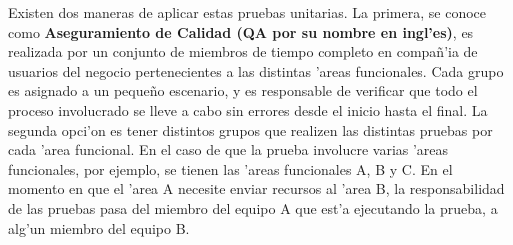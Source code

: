 	Existen dos maneras de aplicar estas pruebas unitarias. La primera, se conoce como \textbf{Aseguramiento de Calidad (QA por su nombre en ingl'es)}, es realizada por un conjunto de miembros de tiempo completo en compa\~n'ia de usuarios del negocio pertenecientes a las distintas 'areas funcionales. Cada grupo es asignado a un peque\~no escenario, y es responsable de verificar que todo el proceso involucrado se lleve a cabo sin errores desde el inicio hasta el final. La segunda opci'on es tener distintos grupos que realizen las distintas pruebas por cada 'area funcional. En el caso de que la prueba involucre varias 'areas funcionales, por ejemplo, se tienen las 'areas funcionales A, B y C. En el momento en que el 'area A necesite enviar recursos al 'area B, la responsabilidad de las pruebas pasa del miembro del equipo A que est'a ejecutando la prueba, a alg'un miembro del equipo B.

